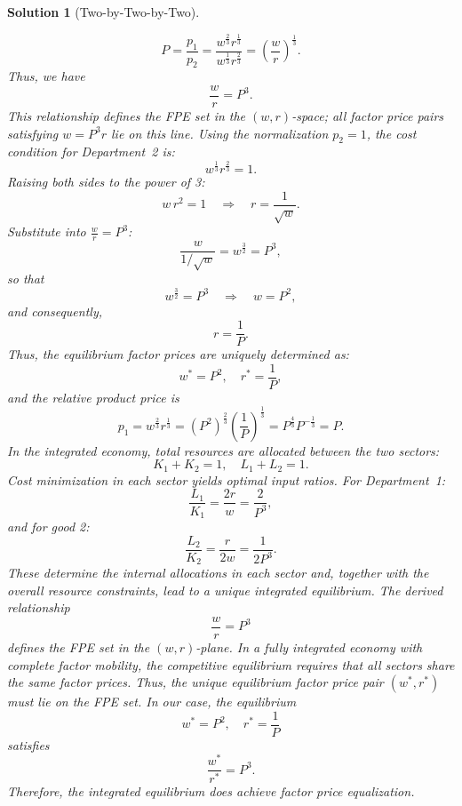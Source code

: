 \documentclass[a4paper,12pt]{article} %
\theoremstyle{nonitalic}
\newtheorem{solution}{Solution}
\begin{document}
\begin{solution}[Two-by-Two-by-Two]
\begin{enumerate}
            \[
            P = \frac{p_1}{p_2} = \frac{w^{\frac{2}{3}}r^{\frac{1}{3}}}{w^{\frac{1}{3}}r^{\frac{2}{3}}} = \left(\frac{w}{r}\right)^{\frac{1}{3}}.
            \]
            Thus, we have
            \[
            \frac{w}{r} = P^3.
            \]
            This relationship defines the \emph{FPE set} in the $(w,r)$-space; all factor price pairs satisfying $w=P^3r$ lie on this line.
            Using the normalization $p_2=1$, the cost condition for Department~2 is:
            \[
            w^{\frac{1}{3}}r^{\frac{2}{3}} = 1.
            \]
            Raising both sides to the power of 3:
            \[
            w\,r^2 = 1 \quad \Rightarrow \quad r = \frac{1}{\sqrt{w}}.
            \]
            Substitute into $\frac{w}{r}=P^3$:
            \[
            \frac{w}{1/\sqrt{w}} = w^{\frac{3}{2}} = P^3,
            \]
            so that
            \[
            w^{\frac{3}{2}} = P^3 \quad \Rightarrow \quad w = P^2,
            \]
            and consequently,
            \[
            r = \frac{1}{P}.
            \]
            Thus, the equilibrium factor prices are uniquely determined as:
            \[
            w^* = P^2,\quad r^* = \frac{1}{P},
            \]
            and the relative product price is
            \[
            p_1 = w^{\frac{2}{3}}r^{\frac{1}{3}} = (P^2)^{\frac{2}{3}}\left(\frac{1}{P}\right)^{\frac{1}{3}} = P^{\frac{4}{3}}P^{-\frac{1}{3}} = P.
            \]
            In the integrated economy, total resources are allocated between the two sectors:
            \[
            K_1 + K_2 = 1,\quad L_1 + L_2 = 1.
            \]
            Cost minimization in each sector yields optimal input ratios. For Department~1:
            \[
            \frac{L_1}{K_1} = \frac{2r}{w} = \frac{2}{P^3},
            \]
            and for good 2:
            \[
            \frac{L_2}{K_2} = \frac{r}{2w} = \frac{1}{2 P^3}.
            \]
            These determine the internal allocations in each sector and, together with the overall resource constraints, lead to a unique integrated equilibrium.
            The derived relationship
            \[
            \frac{w}{r} = P^3
            \]
            defines the FPE set in the $(w, r)$-plane. In a fully integrated economy with complete factor mobility, the competitive equilibrium requires that all sectors share the same factor prices. Thus, the unique equilibrium factor price pair $(w^*,r^*)$ must lie on the FPE set. In our case, the equilibrium
            \[
            w^* = P^2,\quad r^* = \frac{1}{P}
            \]
            satisfies
            \[
            \frac{w^*}{r^*} = P^3.
            \]
            Therefore, the integrated equilibrium \emph{does} achieve factor price equalization.


\end{enumerate}
\end{solution}
\end{document}
